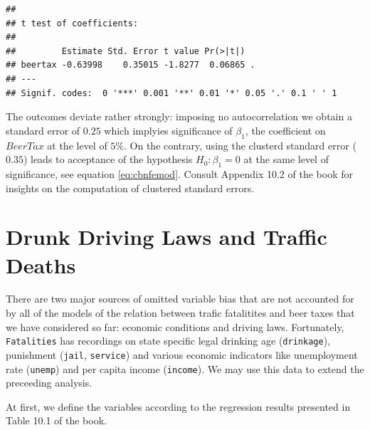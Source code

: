 \documentclass[]{book}
\theoremstyle{definition}
\theoremstyle{definition}
\theoremstyle{definition}
\theoremstyle{remark}
\begin{document}
\begin{verbatim}
## 
## t test of coefficients:
## 
##         Estimate Std. Error t value Pr(>|t|)  
## beertax -0.63998    0.35015 -1.8277  0.06865 .
## ---
## Signif. codes:  0 '***' 0.001 '**' 0.01 '*' 0.05 '.' 0.1 ' ' 1
\end{verbatim}

The outcomes deviate rather strongly: imposing no autocorrelation we
obtain a standard error of \(0.25\) which implyies significance of
\(\beta_1\), the coefficient on \(BeerTax\) at the level of \(5\%\). On
the contrary, using the clusterd standard error (\(0.35\)) leads to
acceptance of the hypothesis \(H_0: \beta_1 = 0\) at the same level of
significance, see equation \eqref{eq:cbnfemod}. Consult Appendix 10.2 of
the book for insights on the computation of clustered standard errors.

\section{Drunk Driving Laws and Traffic
Deaths}\label{drunk-driving-laws-and-traffic-deaths}

There are two major sources of omitted variable bias that are not
accounted for by all of the models of the relation between trafic
fatalitites and beer taxes that we have considered so far: economic
conditions and driving laws. Fortunately, \texttt{Fatalities} has
recordings on state specific legal drinking age (\texttt{drinkage}),
punishment (\texttt{jail}, \texttt{service}) and various economic
indicators like unemployment rate (\texttt{unemp}) and per capita income
(\texttt{income}). We may use this data to extend the preceeding
analysis.

At first, we define the variables according to the regression results
presented in Table 10.1 of the book.
\end{document}
